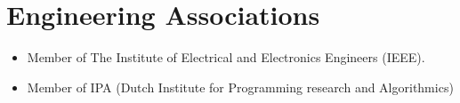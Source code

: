 \section{Engineering Associations}
\begin{itemize}

\item Member of The Institute of Electrical and Electronics
Engineers (IEEE).

\item Member of IPA (Dutch Institute for Programming research and Algorithmics)

\end{itemize}

